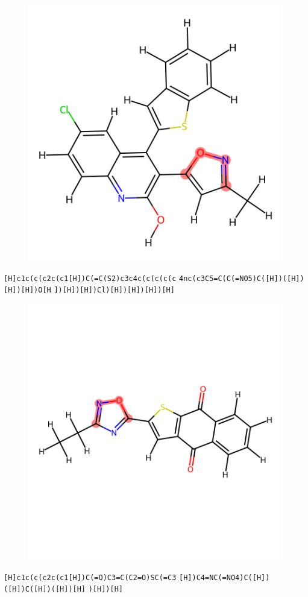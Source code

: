 \documentclass{article}
\begin{document}
\begin{figure}[ht]
\centering
    \includegraphics{mol84.png}
\end{figure}
\verb|[H]c1c(c(c2c(c1[H])C(=C(S2)c3c4c(c(c(c(c| \verb|4nc(c3C5=C(C(=NO5)C([H])([H])[H])[H])O[H| \verb|])[H])[H])Cl)[H])[H])[H])[H]|

\begin{figure}[ht]
\centering
    \includegraphics{mol85.png}
\end{figure}
\verb|[H]c1c(c(c2c(c1[H])C(=O)C3=C(C2=O)SC(=C3| \verb|[H])C4=NC(=NO4)C([H])([H])C([H])([H])[H]| \verb|)[H])[H]|
\end{document}
